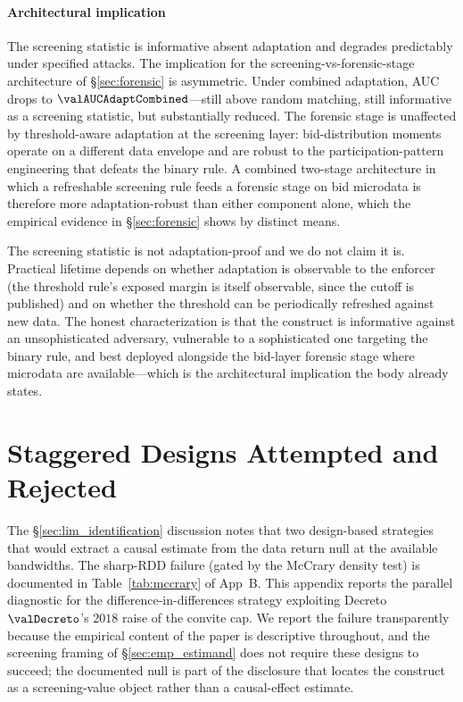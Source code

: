 \paragraph{Architectural implication}
The screening statistic is informative absent adaptation and
degrades predictably under specified attacks. The implication
for the screening-vs-forensic-stage architecture of
§\ref{sec:forensic} is asymmetric. Under combined adaptation,
AUC drops to $\valAUCAdaptCombined$---still above random
matching, still informative as a screening statistic, but
substantially reduced. The forensic stage is unaffected by
threshold-aware adaptation at the screening layer: bid-distribution
moments operate on a different data envelope and are robust to
the participation-pattern engineering that defeats the binary
rule. A combined two-stage architecture in which a refreshable
screening rule feeds a forensic stage on bid microdata is
therefore more adaptation-robust than either component alone,
which the empirical evidence in §\ref{sec:forensic} shows by
distinct means.

The screening statistic is not adaptation-proof and we do not
claim it is. Practical lifetime depends on whether adaptation
is observable to the enforcer (the threshold rule's exposed
margin is itself observable, since the cutoff is published) and
on whether the threshold can be periodically refreshed against
new data. The honest characterization is that the construct is
informative against an unsophisticated adversary, vulnerable to
a sophisticated one targeting the binary rule, and best
deployed alongside the bid-layer forensic stage where microdata
are available---which is the architectural implication the body
already states.

\section{Staggered Designs Attempted and Rejected}
\label{app:staggered}

The §\ref{sec:lim_identification} discussion notes that two
design-based strategies that would extract a causal estimate
from the data return null at the available bandwidths. The
sharp-RDD failure (gated by the McCrary density test) is
documented in Table~\ref{tab:mccrary} of App~B. This appendix
reports the parallel diagnostic for the difference-in-differences
strategy exploiting Decreto~$\valDecreto$'s $2018$ raise of the
convite cap. We report the failure transparently because the
empirical content of the paper is descriptive throughout, and
the screening framing of §\ref{sec:emp_estimand} does not
require these designs to succeed; the documented null is part
of the disclosure that locates the construct as a screening-value
object rather than a causal-effect estimate.


